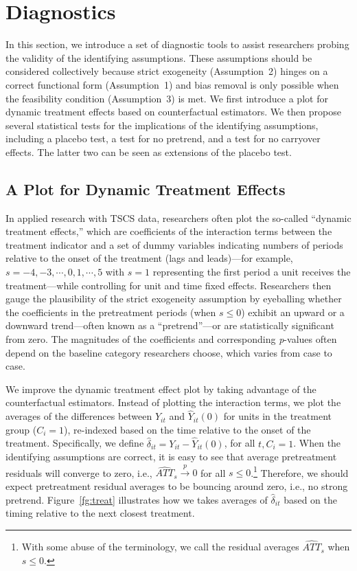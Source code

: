 \documentclass[12pt]{article}
\begin{document}
\section{Diagnostics}\label{sc:diag}

In this section, we introduce a set of diagnostic tools to assist researchers probing the validity of the identifying assumptions. These assumptions should be considered collectively because strict exogeneity (Assumption~2) hinges on a correct functional form (Assumption~1) and bias removal is only possible when the feasibility condition (Assumption~3) is met. We first introduce a plot for dynamic treatment effects based on counterfactual estimators. We then propose several statistical tests for the implications of the identifying assumptions, including a placebo test, a test for no pretrend, and a test for no carryover effects. The latter two can be seen as extensions of the placebo test.  

\subsection{A Plot for Dynamic Treatment Effects}

In applied research with TSCS data, researchers often plot the so-called ``dynamic treatment effects,'' which are coefficients of the interaction terms between the treatment indicator and a set of dummy variables indicating numbers of periods relative to the onset of the treatment (lags and leads)---for example, $s = -4, -3, \cdots, 0, 1, \cdots, 5$ with $s=1$ representing the first period a unit receives the treatment---while controlling for unit and time fixed effects. Researchers then gauge the plausibility of the strict exogeneity assumption by eyeballing whether the coefficients in the pretreatment periods (when $s \leq 0$) exhibit an upward or a downward trend---often known as a ``pretrend''---or are statistically significant from zero. The magnitudes of the coefficients and corresponding {\it p}-values often depend on the baseline category researchers choose, which varies from case to case.

We improve the dynamic treatment effect plot by taking advantage of the counterfactual estimators. Instead of plotting the interaction terms, we plot the averages of the differences between $Y_{it}$ and $\hat{Y}_{it}(0)$ for units in the treatment group ($C_i = 1$), re-indexed based on the time relative to the onset of the treatment. Specifically, we define $\hat{\delta}_{it} = Y_{it} - \hat{Y}_{it}(0)$, for all $t, C_i = 1$. When the identifying assumptions are correct, it is easy to see that average pretreatment residuals will converge to zero, i.e., $\widehat{ATT}_{s}\overset{p}{\to}0$ for all $s\leq0$.\footnote{With some abuse of the terminology, we call the residual averages $\widehat{ATT}_{s}$ when $s\leq 0$.} Therefore, we should expect pretreatment residual averages to be bouncing around zero, i.e., no strong pretrend. Figure~\ref{fg:treat} illustrates how we takes averages of $\hat\delta_{it}$ based on the timing relative to the next closest treatment. 
\end{document}

